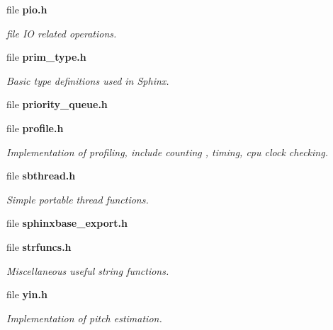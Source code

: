 \begin{DoxyCompactItemize}
file {\bf pio.\-h}
\begin{DoxyCompactList}\small\item\em file I\-O related operations. \end{DoxyCompactList}\item 
file {\bf prim\-\_\-type.\-h}
\begin{DoxyCompactList}\small\item\em Basic type definitions used in Sphinx. \end{DoxyCompactList}\item 
file {\bfseries priority\-\_\-queue.\-h}
\item 
file {\bf profile.\-h}
\begin{DoxyCompactList}\small\item\em Implementation of profiling, include counting , timing, cpu clock checking. \end{DoxyCompactList}\item 
file {\bf sbthread.\-h}
\begin{DoxyCompactList}\small\item\em Simple portable thread functions. \end{DoxyCompactList}\item 
file {\bfseries sphinxbase\-\_\-export.\-h}
\item 
file {\bf strfuncs.\-h}
\begin{DoxyCompactList}\small\item\em Miscellaneous useful string functions. \end{DoxyCompactList}\item 
file {\bf yin.\-h}
\begin{DoxyCompactList}\small\item\em Implementation of pitch estimation. \end{DoxyCompactList}\end{DoxyCompactItemize}
